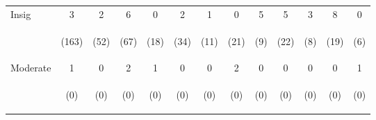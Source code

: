 \begin{tabular}{lcccccccccccc}
\hline \noalign{\smallskip}Insig & 3 & 2 & 6 & 0 & 2 & 1 & 0 & 5 & 5 & 3 & 8 & 0\\
 & \begin{footnotesize}(163)\end{footnotesize} & \begin{footnotesize}(52)\end{footnotesize} & \begin{footnotesize}(67)\end{footnotesize} & \begin{footnotesize}(18)\end{footnotesize} & \begin{footnotesize}(34)\end{footnotesize} & \begin{footnotesize}(11)\end{footnotesize} & \begin{footnotesize}(21)\end{footnotesize} & \begin{footnotesize}(9)\end{footnotesize} & \begin{footnotesize}(22)\end{footnotesize} & \begin{footnotesize}(8)\end{footnotesize} & \begin{footnotesize}(19)\end{footnotesize} & \begin{footnotesize}(6)\end{footnotesize}\\
\noalign{\smallskip}Moderate & 1 & 0 & 2 & 1 & 0 & 0 & 2 & 0 & 0 & 0 & 0 & 1\\
 & \begin{footnotesize}(0)\end{footnotesize} & \begin{footnotesize}(0)\end{footnotesize} & \begin{footnotesize}(0)\end{footnotesize} & \begin{footnotesize}(0)\end{footnotesize} & \begin{footnotesize}(0)\end{footnotesize} & \begin{footnotesize}(0)\end{footnotesize} & \begin{footnotesize}(0)\end{footnotesize} & \begin{footnotesize}(0)\end{footnotesize} & \begin{footnotesize}(0)\end{footnotesize} & \begin{footnotesize}(0)\end{footnotesize} & \begin{footnotesize}(0)\end{footnotesize} & \begin{footnotesize}(0)\end{footnotesize}\\

\end{tabular}
